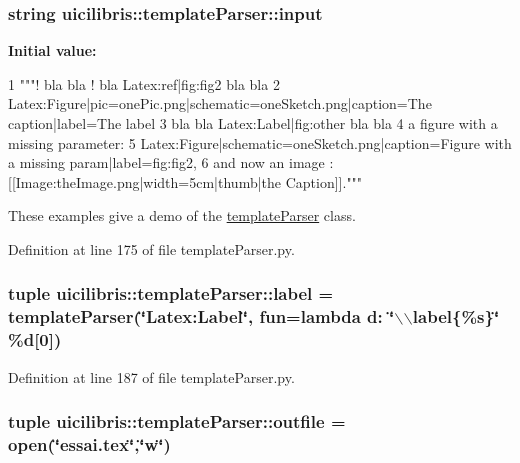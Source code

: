 \hypertarget{namespaceuicilibris_1_1templateParser_a934a014ef49ba892753e6d54dbeb35f3}{
\subsubsection[{input}]{\setlength{\rightskip}{0pt plus 5cm}string {\bf uicilibris\-::template\-Parser\-::input}}}\label{namespaceuicilibris_1_1templateParser_a934a014ef49ba892753e6d54dbeb35f3}
{\bfseries \-Initial value\-:}
\begin{DoxyCode}
1 """{{!}} bla bla {{!}} bla {{Latex:ref|fig:fig2}} bla bla
2 {{Latex:Figure|pic=onePic.png|schematic=oneSketch.png|caption=The
       caption|label=The label}}
3 bla bla {{Latex:Label|fig:other}} bla bla
4 a figure with a missing parameter:
5 {{Latex:Figure|schematic=oneSketch.png|caption=Figure with a missing
       param|label=fig:fig2}},
6 and now an image : [[Image:theImage.png|width=5cm|thumb|the Caption]]."""
\end{DoxyCode}


\-These examples give a demo of the \hyperlink{classuicilibris_1_1templateParser_1_1templateParser}{template\-Parser} class. 



\-Definition at line 175 of file template\-Parser.\-py.

\hypertarget{namespaceuicilibris_1_1templateParser_acb433717f6e1666289157d06c74bb9bc}{
\subsubsection[{label}]{\setlength{\rightskip}{0pt plus 5cm}tuple {\bf uicilibris\-::template\-Parser\-::label} = {\bf template\-Parser}(\char`\"{}\-Latex\-:\-Label\char`\"{}, fun=lambda d\-: \char`\"{}$\backslash$$\backslash$label\{\%s\}\char`\"{} \%d\mbox{[}0\mbox{]})}}\label{namespaceuicilibris_1_1templateParser_acb433717f6e1666289157d06c74bb9bc}


\-Definition at line 187 of file template\-Parser.\-py.

\hypertarget{namespaceuicilibris_1_1templateParser_a0a8c084e3ba11efc717d4352c01ca327}{
\subsubsection[{outfile}]{\setlength{\rightskip}{0pt plus 5cm}tuple {\bf uicilibris\-::template\-Parser\-::outfile} = open(\char`\"{}essai.\-tex\char`\"{},\char`\"{}w\char`\"{})}}\label{namespaceuicilibris_1_1templateParser_a0a8c084e3ba11efc717d4352c01ca327}



